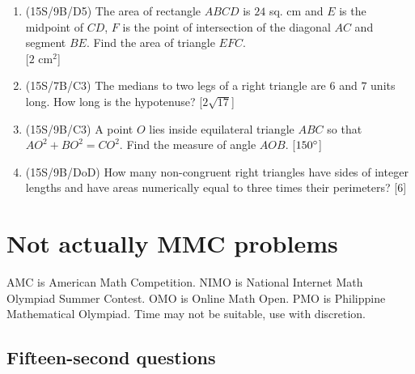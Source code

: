 \documentclass[11pt,paper=letter]{scrartcl}
\begin{document}
\begin{enumerate}
\item (15S/9B/D5) The area of rectangle $ABCD$ is $24$ sq. cm and $E$ is the midpoint of $CD$, $F$ is the point of intersection of the diagonal $AC$ and segment $BE$. Find the area of triangle $EFC$. \\ \phantom{.} \hfill [$2 \text{ cm}^2$]

\item (15S/7B/C3) The medians to two legs of a right triangle are $6$ and $7$ units long. How long is the hypotenuse? \hfill [$2\sqrt{17}$]

\item (15S/9B/C3) A point $O$ lies inside equilateral triangle $ABC$ so that $AO^2 + BO^2 = CO^2$. Find the measure of angle $AOB$. \hfill [$150^\circ$]

\item (15S/9B/DoD) How many non-congruent right triangles have sides of integer lengths and have areas numerically equal to three times their perimeters? \hfill [$6$]

\end{enumerate}

\section{Not actually MMC problems}

AMC is American Math Competition. NIMO is National Internet Math Olympiad Summer Contest. OMO is Online Math Open. PMO is Philippine Mathematical Olympiad. Time may not be suitable, use with discretion.

\subsection{Fifteen-second questions}
\end{document}
